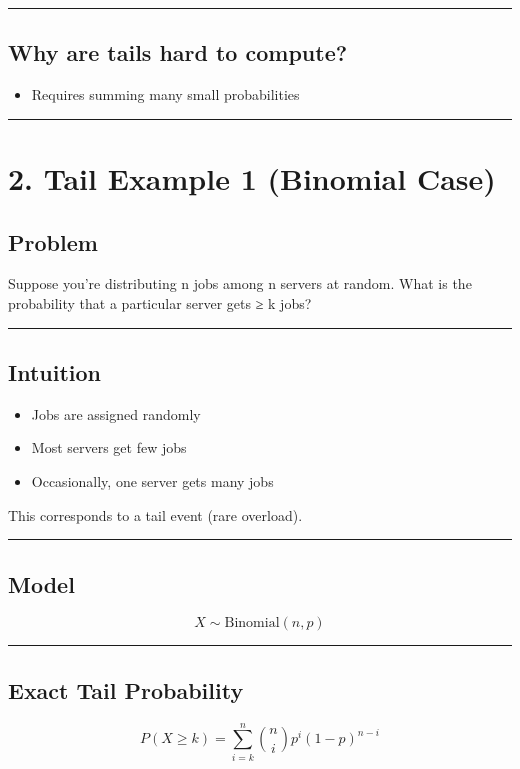 \documentclass[12pt]{article}
\begin{document}
\hrule

\subsection*{Why are tails hard to compute?}

\begin{itemize}
\item Requires summing many small probabilities
\end{itemize}

\hrule

\section*{2. Tail Example 1 (Binomial Case)}

\subsection*{Problem}

Suppose you’re distributing n jobs among n servers at random. What is the probability that a particular server gets ≥ k jobs?

\hrule

\subsection*{Intuition}

\begin{itemize}
\item Jobs are assigned randomly
\item Most servers get few jobs
\item Occasionally, one server gets many jobs
\end{itemize}

This corresponds to a tail event (rare overload).

\hrule

\subsection*{Model}

\[
X \sim \text{Binomial}(n, p)
\]

\hrule

\subsection*{Exact Tail Probability}

\[
P(X \geq k) = \sum_{i=k}^{n} \binom{n}{i} p^i (1 - p)^{n - i}
\]
\end{document}
